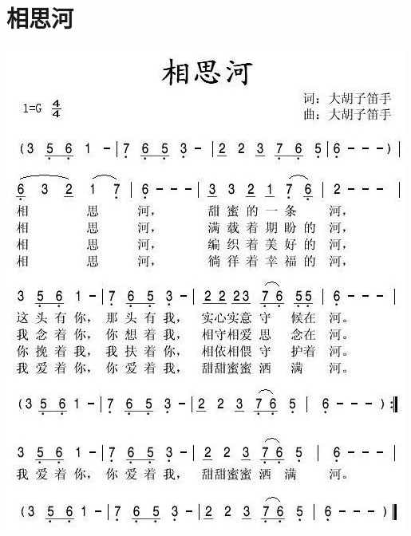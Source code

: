 \documentclass[cn,pad,twocol]{elegantbook}
\begin{document}
\section{相思河}    \includegraphics[width=\textwidth]{dongxiao/20200901-相思河.jpeg}
\end{document}
